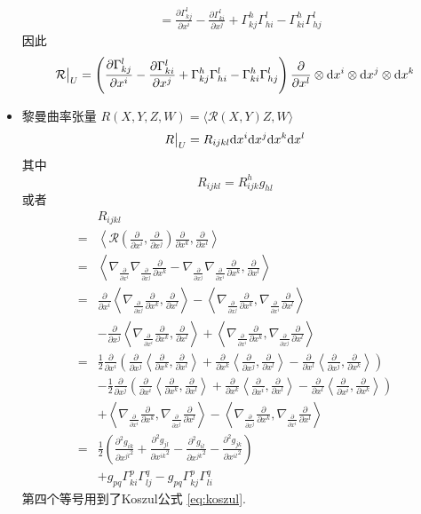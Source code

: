 \documentclass{book}
\newcommand{\md}{{\rm d}}
\newcommand{\pd}[2]{\frac{\partial #1}{\partial #2}}
\newcommand{\npd}[3]{\frac{\partial^{#1}{#2}}{\partial{#3}^{#1}}}
\newcommand{\lc}[2]{\nabla_{#1}{#2}}
\begin{document}
\begin{itemize}
\begin{align*}
                &= \pd{\Gamma_{kj}^{l}}{x^i} - \pd{\Gamma_{ki}^{l}}{x^j} + \Gamma_{kj}^{h}\Gamma_{hi}^{l} - \Gamma_{ki}^{h}\Gamma_{hj}^{l}
            \end{align*}
            因此
            \begin{equation*}
                \mathcal{R}\big|_U = \left(\pd{\Gamma_{kj}^{l}}{x^i} - \pd{\Gamma_{ki}^{l}}{x^j} + \Gamma_{kj}^{h}\Gamma_{hi}^{l} - \Gamma_{ki}^{h}\Gamma_{hj}^{l}\right)\pd{}{x^l}\otimes\md{x^i}\otimes\md{x^j}\otimes\md{x^k}
            \end{equation*}
            \item 黎曼曲率张量 $R(X,Y,Z,W) = \langle\mathcal{R}(X,Y)Z,W\rangle$
            \begin{equation*}
                R\big|_U = R_{ijkl}\md{x^i}\md{x^j}\md{x^k}\md{x^l}
            \end{equation*}
            其中
            \begin{equation*}
                R_{ijkl} = R_{ijk}^{h}g_{hl}
            \end{equation*}
            或者
            \begin{align*}
                & R_{ijkl} \\
                =& \left<\mathcal{R}\left(\pd{}{x^i},\pd{}{x^j}\right)\pd{}{x^k},\pd{}{x^l}\right> \\
                =& \left<\lc{\pd{}{x^i}}{\lc{\pd{}{x^j}}{\pd{}{x^k}}} - \lc{\pd{}{x^j}}{\lc{\pd{}{x^i}}{\pd{}{x^k}}},\pd{}{x^l}\right> \\
                =& \pd{}{x^i}\left<\lc{\pd{}{x^j}}{\pd{}{x^k}},\pd{}{x^l}\right> - \left<\lc{\pd{}{x^j}}{\pd{}{x^k}},\lc{\pd{}{x^i}}{\pd{}{x^l}}\right> \\
                & -\pd{}{x^j}\left<\lc{\pd{}{x^i}}{\pd{}{x^k}},\pd{}{x^l}\right> + \left<\lc{\pd{}{x^i}}{\pd{}{x^k}},\lc{\pd{}{x^j}}{\pd{}{x^l}}\right> \\
                =& \frac{1}{2}\pd{}{x^i}\left(\pd{}{x^j}\left<\pd{}{x^k},\pd{}{x^l}\right>+\pd{}{x^k}\left<\pd{}{x^j},\pd{}{x^l}\right>-\pd{}{x^l}\left<\pd{}{x^j},\pd{}{x^k}\right>\right) \\
                & -\frac{1}{2}\pd{}{x^j}\left(\pd{}{x^i}\left<\pd{}{x^k},\pd{}{x^l}\right>+\pd{}{x^k}\left<\pd{}{x^i},\pd{}{x^l}\right>-\pd{}{x^l}\left<\pd{}{x^i},\pd{}{x^k}\right>\right) \\
                & +\left<\lc{\pd{}{x^i}}{\pd{}{x^k}},\lc{\pd{}{x^j}}{\pd{}{x^l}}\right>-\left<\lc{\pd{}{x^j}}{\pd{}{x^k}},\lc{\pd{}{x^i}}{\pd{}{x^l}}\right> \\
                =& \frac{1}{2}\left(\npd{2}{g_{ik}}{x^{jl}}+\npd{2}{g_{jl}}{x^{ik}}-\npd{2}{g_{il}}{x^{jk}}-\npd{2}{g_{jk}}{x^{il}}\right) \\
                & +g_{pq}\Gamma_{ki}^{p}\Gamma_{lj}^{q}-g_{pq}\Gamma_{kj}^{p}\Gamma_{li}^{q}
            \end{align*}
            第四个等号用到了Koszul公式 \ref{eq:koszul}.
        \end{itemize}
\end{document}

